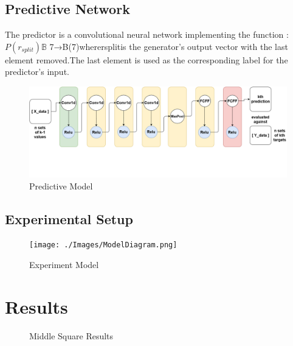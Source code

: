 \documentclass[conference]{IEEEtran}
\begin{document}
\subsection{Predictive Network}
The predictor is a convolutional neural network implementing the function
: $P(r_{split}) \mathbb{B}$ 7→B(7)wherersplitis  the  generator’s  output  vector  with  the  last  element  removed.The  last  element  is  used  as  the  corresponding  label  for  the  predictor’s  input.
\begin{figure}[H]
\centering
\includegraphics[width=1\linewidth]{./Images/PredictiveModel.png}
\caption{Predictive Model}
\label{fig:globfig}
\end{figure}

\subsection{Experimental Setup}
\begin{figure}[H]
\centering
\texttt{[image: ./Images/ModelDiagram.png]}
\caption{Experiment Model}
\label{fig:globfig}
\end{figure}


\section{Results}

\begin{figure}[H]
\centering
{}
\qquad
{}
\caption{Middle Square Results}
\label{fig:globfig}
\end{figure}
\end{document}
